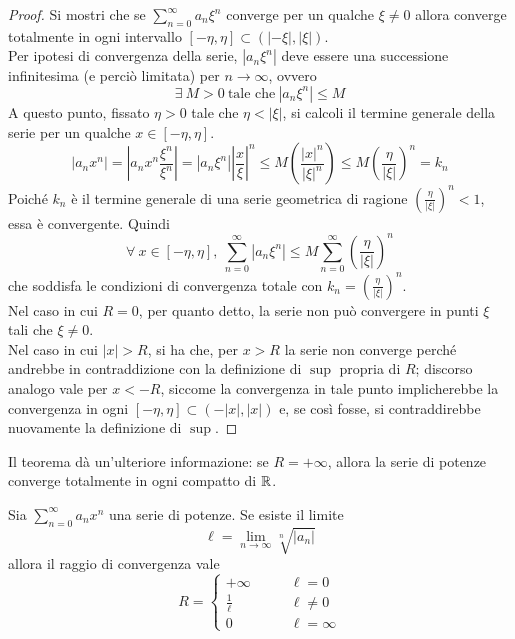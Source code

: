 \begin{proof}
 Si mostri che se $\sum\limits_{n=0}^{\infty}{a_n \xi^n}$ converge per un qualche $\xi \neq 0$ allora converge totalmente in ogni intervallo $[-\eta, \eta] \subset (|-\xi|, |\xi|)$.\\
 Per ipotesi di convergenza della serie, $|a_n \xi^n|$ deve essere una successione infinitesima (e perciò limitata) per $n\to \infty$, ovvero
 \begin{equation}
     \exists\ M>0\ \text{tale che}\ |a_n\xi^n|\leq M
 \end{equation}
 A questo punto, fissato $\eta>0$ tale che $\eta<|\xi|$, si calcoli il termine generale della serie per un qualche $x \in [-\eta, \eta]$.
 \begin{equation}
     |a_n x^n| = \left|a_n x^n \frac{\xi^n}{\xi^n}\right|=\left|a_n \xi^n\right| \left|\frac{x}{\xi}\right|^n \leq M \left(\frac{|x|^n}{\left|\xi\right|^n} \right)\leq M \left(\frac{\eta}{\left| \xi \right|} \right)^n =k_n
 \end{equation}
 Poiché $k_n$ è il termine generale di una serie geometrica di ragione $\left(\tfrac{\eta}{\left| \xi \right|} \right)^n < 1$, essa è convergente. Quindi
 \begin{equation}
 \forall\ x \in [-\eta, \eta],\ \sum\limits_{n=0}^{\infty}{|a_n \xi^n|} \leq M \sum_{n=0}^{\infty}{\left(\frac{\eta}{\left| \xi \right|} \right)^n}
 \end{equation}
 che soddisfa le condizioni di convergenza totale con $k_n=\left(\tfrac{\eta}{\left| \xi \right|} \right)^n$.\\
 Nel caso in cui $R=0$, per quanto detto, la serie non può convergere in punti $\xi$ tali che $\xi \neq 0$.\\
 Nel caso in cui $|x|>R$, si ha che, per $x>R$ la serie non converge perché andrebbe in contraddizione con la definizione di $\sup$ propria di $R$; discorso analogo vale per $x<-R$, siccome la convergenza in tale punto implicherebbe la convergenza in ogni $[-\eta, \eta] \subset (-|x|, |x|)$ e, se così fosse, si contraddirebbe nuovamente la definizione di $\sup$.
\end{proof}
\begin{oss}
Il teorema dà un'ulteriore informazione: se $R= +\infty$, allora la serie di potenze converge totalmente in ogni compatto di $\mathbb{R}$.
\end{oss}
\begin{theorem} \label{Teo: Criterio di Cauchy-Hadamard}
Sia $\sum\limits_{n=0}^{\infty}{a_n x^n}$ una serie di potenze. Se esiste il limite
\begin{equation}
    \ell=\lim_{n \to \infty}{\sqrt[n]{|a_n|}}
\end{equation}
    allora il raggio di convergenza vale
    \begin{equation}
        R = \begin{cases}
            +\infty &\qquad \ell=0\\
            \frac{1}{\ell} &\qquad \ell \neq 0\\
            0 &\qquad \ell = \infty
        \end{cases}
    \end{equation}
\end{theorem}
